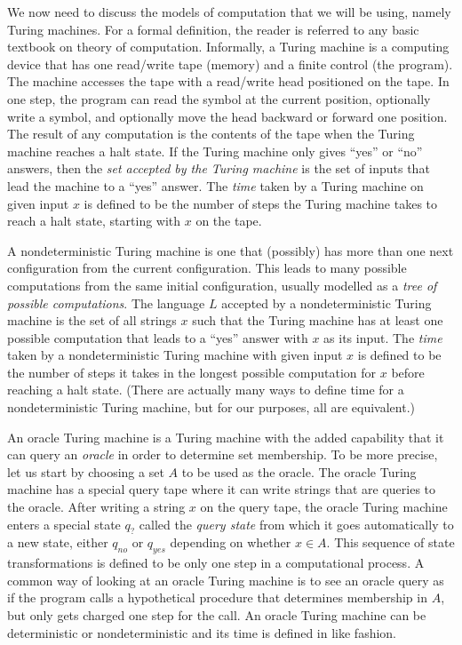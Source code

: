 We now need to discuss the models of computation that we will be using,
namely Turing machines.  For a formal definition, the reader is referred to
any basic textbook on theory of computation.  Informally, a Turing machine is
a computing device that has one read/write tape (memory) and a finite
control (the program). The machine accesses the tape with a read/write head
positioned on the tape.  In one step, the program can read the symbol at the
current position, optionally write a symbol, and optionally move the head
backward or forward one position.
The result of any computation is the contents of the tape when the Turing
machine reaches a halt state.  If the Turing machine only gives ``yes'' or
``no'' answers, then the {\em set accepted by the Turing machine\/} is the
set of inputs that lead the machine to a ``yes'' answer.  The {\em time\/}
taken by a Turing machine on given input $x$ is defined to be the number of
steps the Turing machine takes to reach a halt state, starting with $x$ on
the tape.

A nondeterministic Turing machine is one that (possibly) has
more than one next configuration from the current configuration.
This leads to many possible computations from the same initial
configuration, usually modelled as a {\em tree of possible
computations}.
The language $L$ accepted by a nondeterministic Turing machine is the set of
all strings $x$ such that the Turing machine has at least one possible
computation that leads to a ``yes'' answer with $x$ as its input.
The {\em time\/} taken by a nondeterministic Turing machine with given input
$x$ is defined to be the number of steps it takes in the longest possible
computation for $x$ before reaching a halt state.
(There are actually many ways to define time for a nondeterministic Turing
machine, but for our purposes, all are equivalent.)

An oracle Turing machine is a Turing machine with the added capability that
it can query an {\em oracle\/} in order to determine set membership.  To be
more precise, let us start by choosing a set $A$ to be used as the oracle.
The oracle Turing machine has a special query tape where it can write strings
that are queries to the oracle.  After writing a string $x$ on the query tape,
the oracle Turing machine enters a special state $q_?$ called the {\em query
state\/} from which it goes automatically to a new state, either $q_{no}$ or
$q_{yes}$ depending on whether $x \in A$.  This sequence of state
transformations is defined to be only one step in a computational process.
A common way of looking at an oracle Turing machine is to see an oracle query
as if the program calls a hypothetical procedure that determines membership
in $A$, but only gets charged one step for the call.
An oracle Turing machine can be deterministic or
nondeterministic and its time is defined in like fashion.

